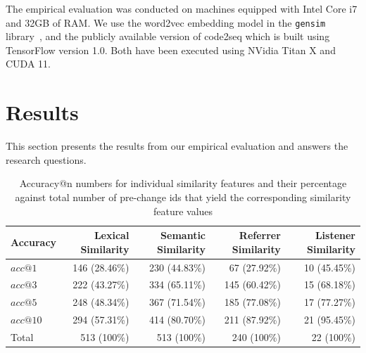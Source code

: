 \documentclass[sigconf]{acmart}
\begin{document}
The empirical evaluation was conducted on machines equipped with Intel Core i7 
and 32GB of RAM. We use the word2vec embedding model in the \texttt{gensim} 
library~\cite{Rehurek2010bs}, and the publicly available version of code2seq 
which is built using TensorFlow version 1.0. Both have been executed using 
NVidia Titan X and CUDA 11.



\section{Results}
\label{sec:results}

This section presents the results from our empirical evaluation and answers
the research questions.

\begin{table}[ht]
  \caption{Accuracy@n numbers for individual similarity features and their
    percentage against total number of pre-change ids that yield the corresponding
    similarity feature values\label{tab:individual_ranking}}
  \begin{tabular}{lrrrr}
    \toprule
    Accuracy & Lexical Similarity & Semantic Similarity & Referrer Similarity & Listener Similarity \\ \midrule
    $acc@1$  & 146 (28.46\%)      & 230 (44.83\%)       & 67  (27.92\%)       & 10 (45.45\%)        \\
    $acc@3$  & 222 (43.27\%)      & 334 (65.11\%)       & 145 (60.42\%)       & 15 (68.18\%)        \\
    $acc@5$  & 248 (48.34\%)      & 367 (71.54\%)       & 185 (77.08\%)       & 17 (77.27\%)        \\
    $acc@10$ & 294 (57.31\%)      & 414 (80.70\%)       & 211 (87.92\%)       & 21 (95.45\%)        \\
    \midrule
    Total    & 513 (100\%)        & 513 (100\%)         & 240 (100\%)         & 22 (100\%)          \\
    \bottomrule
  \end{tabular}
\end{table}
\end{document}
